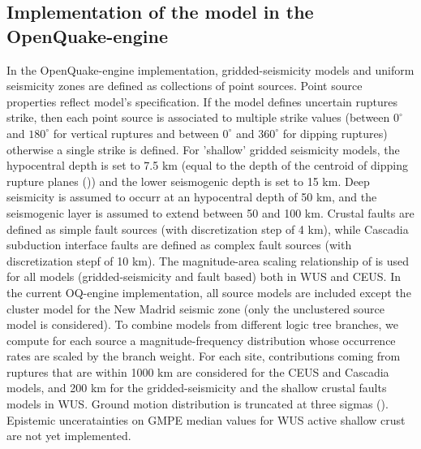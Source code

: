 \subsection{Implementation of the model in the OpenQuake-engine}
In the OpenQuake-engine implementation, gridded-seismicity models and uniform seismicity zones are defined as collections of point sources. Point source properties reflect model's specification. If the model defines uncertain ruptures strike, then each point source is associated to multiple strike values (between $0^{\circ}$ and $180^{\circ}$ for vertical ruptures and between $0^{\circ}$ and $360^{\circ}$ for dipping ruptures) otherwise a single strike is defined. For 'shallow' gridded seismicity models, the hypocentral depth is set to 7.5 km (equal to the depth of the centroid of dipping rupture planes (\cite{pertersen2008})) and the lower seismogenic depth is set to 15 km. Deep seismicity is assumed to occurr at an hypocentral depth of 50 km, and the seismogenic layer is assumed to extend between 50 and 100 km. Crustal faults are defined as simple fault sources (with discretization step of 4 km), while Cascadia subduction interface faults are defined as complex fault sources (with discretization stepf of 10 km). The magnitude-area scaling relationship of \cite{wells1994} is used for all models (gridded-seismicity and fault based) both in WUS and CEUS. In the current OQ-engine implementation, all source models are included except the cluster model for the New Madrid seismic zone (only the unclustered source model is considered). To combine models from different logic tree branches, we compute for each source a magnitude-frequency distribution whose occurrence rates are scaled by the branch weight. For each site, contributions coming from ruptures that are within 1000 km are considered for the CEUS and Cascadia models, and 200 km for the gridded-seismicity and the shallow crustal faults models in WUS. Ground motion distribution is truncated at three sigmas (\cite{pertersen2008}). Epistemic unceratainties on GMPE median values for WUS active shallow crust are not yet implemented.

